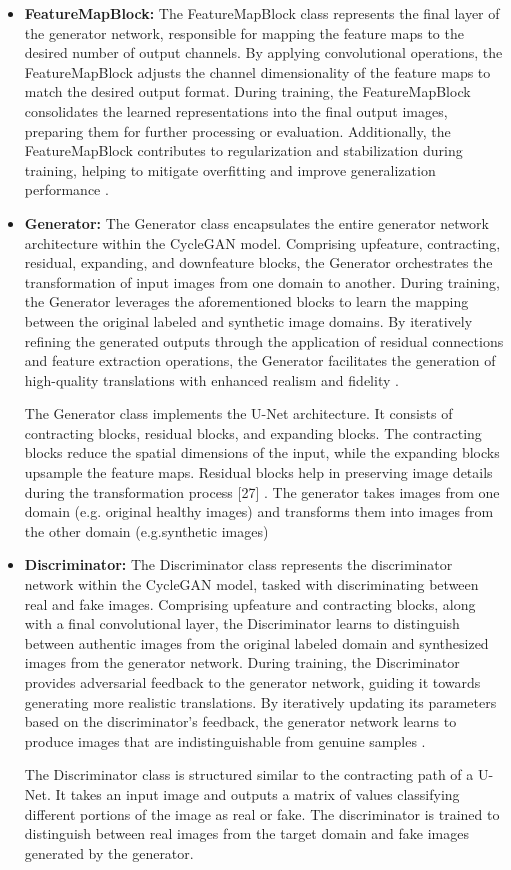 \documentclass[UKenglish,12pt]{master-style}
\begin{document}
\begin{itemize}
\item \textbf{FeatureMapBlock:}
The FeatureMapBlock class represents the final layer of the generator network, responsible for mapping the feature maps to the desired number of output channels. By applying convolutional operations, the FeatureMapBlock adjusts the channel dimensionality of the feature maps to match the desired output format. During training, the FeatureMapBlock consolidates the learned representations into the final output images, preparing them for further processing or evaluation. Additionally, the FeatureMapBlock contributes to regularization and stabilization during training, helping to mitigate overfitting and improve generalization performance \cite{CycleGAN} .

\item \textbf{Generator:}
The Generator class encapsulates the entire generator network architecture within the CycleGAN model. Comprising upfeature, contracting, residual, expanding, and downfeature blocks, the Generator orchestrates the transformation of input images from one domain to another. During training, the Generator leverages the aforementioned blocks to learn the mapping between the original labeled and synthetic image domains. By iteratively refining the generated outputs through the application of residual connections and feature extraction operations, the Generator facilitates the generation of high-quality translations with enhanced realism and fidelity \cite{CycleGAN} .

The Generator class implements the U-Net architecture. It consists of contracting blocks, residual blocks, and expanding blocks. The contracting blocks reduce the spatial dimensions of the input, while the expanding blocks upsample the feature maps. Residual blocks help in preserving image details during the transformation process [27] . The generator takes images from one domain (e.g. original healthy images) and transforms them into images from the other domain (e.g.synthetic images)

\item \textbf{Discriminator:}
The Discriminator class represents the discriminator network within the CycleGAN model, tasked with discriminating between real and fake images. Comprising upfeature and contracting blocks, along with a final convolutional layer, the Discriminator learns to distinguish between authentic images from the original labeled domain and synthesized images from the generator network. During training, the Discriminator provides adversarial feedback to the generator network, guiding it towards generating more realistic translations. By iteratively updating its parameters based on the discriminator's feedback, the generator network learns to produce images that are indistinguishable from genuine samples \cite{CycleGAN} .

The Discriminator class is structured similar to the contracting path of a U-Net. It takes an input image and outputs a matrix of values classifying different portions of the image as real or fake. The discriminator is trained to distinguish between real images from the target domain and fake images generated by the
generator.
\end{itemize}
\end{document}
